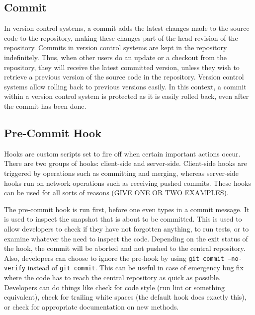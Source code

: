 \documentclass[conference]{IEEEtran}
\begin{document}
\subsection{Commit}
\label{sub:Commit}

In version control systems, a commit adds the latest changes made to the source code to the repository, making these changes part of the head revision of the repository.
Commits in version control systems are kept in the repository indefinitely. Thus, when other users do an update or a checkout from the repository, they will receive the latest committed version, unless they wish to retrieve a previous version of the source code in the repository.
Version control systems allow rolling back to previous versions easily.
In this context, a commit within a version control system is protected as it is easily rolled back, even after the commit has been done.

\subsection{Pre-Commit Hook}
\label{sub:Pre-Commit Hook}

Hooks are custom scripts set to fire off when certain important actions occur.
There are two groups of  hooks: client-side and server-side.
Client-side hooks are triggered by operations such as committing and merging, whereas server-side hooks run on network operations such as receiving pushed commits.
These hooks can be used for all sorts of reasons (GIVE ONE OR TWO EXAMPLES).


The pre-commit hook is run first, before one even types in a commit message. It is used to inspect the snapshot that is about to be committed.
This is used to allow developers to check if they have not forgotten anything, to run tests, or to examine whatever the need to inspect the code.
Depending on the exit status of the hook, the commit will be aborted and not pushed to the central repository.
Also, developers can choose to ignore the pre-hook by using \texttt{git commit --no-verify} instead of \texttt{git commit}.
This can be useful in case of emergency bug fix where the code has to reach the central repository as quick as possible.
Developers can do things like check for code style (run lint or something equivalent), check for trailing white spaces (the default hook does exactly this), or check for appropriate documentation on new methods.
\end{document}

